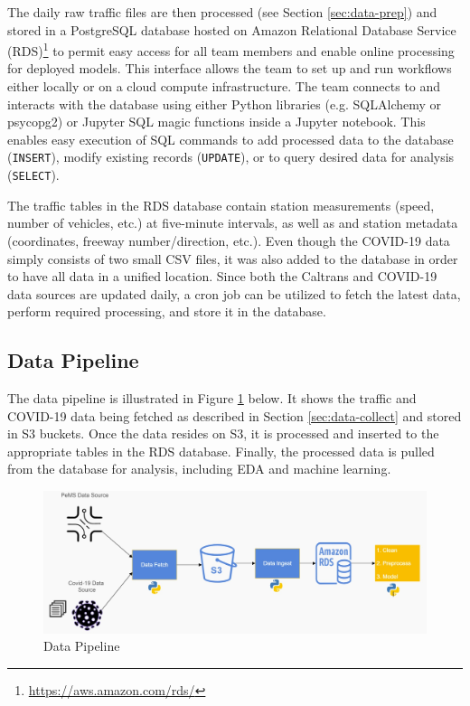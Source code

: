 \documentclass{article}
\begin{document}
The daily raw traffic files are then processed (see Section \ref{sec:data-prep}) and stored in a PostgreSQL database hosted on Amazon Relational Database Service (RDS)\footnote{\url{https://aws.amazon.com/rds/}} to permit easy access for all team members and enable online processing for deployed models. This interface allows the team to set up and run workflows either locally or on a cloud compute infrastructure. The team connects to and interacts with the database using either Python libraries (e.g. SQLAlchemy or psycopg2) or Jupyter SQL magic functions inside a Jupyter notebook. This enables easy execution of SQL commands to add processed data to the database (\texttt{INSERT}), modify existing records (\texttt{UPDATE}), or to query desired data for analysis (\texttt{SELECT}).

The traffic tables in the RDS database contain station measurements (speed, number of vehicles, etc.) at five-minute intervals, as well as and station metadata (coordinates, freeway number/direction, etc.). Even though the COVID-19 data simply consists of two small CSV files, it was also added to the database in order to have all data in a unified location. Since both the Caltrans and COVID-19 data sources are updated daily, a cron job can be utilized to fetch the latest data, perform required processing, and store it in the database.

\subsection{Data Pipeline}
\label{sec:data-pipeline}

The data pipeline is illustrated in Figure \ref{fig:data-pipeline} below. It shows the traffic and COVID-19 data being fetched as described in Section \ref{sec:data-collect} and stored in S3 buckets. Once the data resides on S3, it is processed and inserted to the appropriate tables in the RDS database. Finally, the processed data is pulled from the database for analysis, including EDA and machine learning.

\begin{figure}[hbt!]
	\centering
	\includegraphics[width=\textwidth]{images/data-pipeline-new.jpeg}
	\caption{Data Pipeline}
	\label{fig:data-pipeline}
\end{figure}
\end{document}

